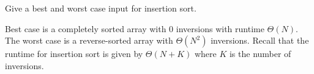 \question Give a best and worst case input for insertion sort.

\begin{solution}[0.5in]
Best case is a completely sorted array with 0 inversions with runtime $\Theta(N)$.
The worst case is a reverse-sorted array with $\Theta(N^2)$ inversions. Recall that the
runtime for insertion sort is given by $\Theta(N + K)$ where $K$ is the number
of inversions.
\end{solution}
